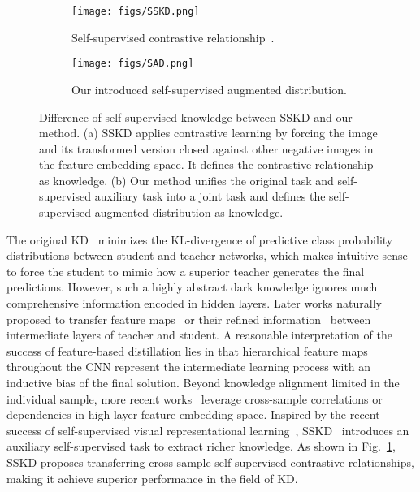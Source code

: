 \documentclass{article}
\begin{document}
\begin{figure}[t]
	\centering 
	\begin{subfigure}[t]{0.43\textwidth}
		\centering
		\texttt{[image: figs/SSKD.png]}
		\caption{Self-supervised contrastive relationship~\cite{DBLP:conf/eccv/XuLLL20}.}
		\label{scl_}
	\end{subfigure}
	\begin{subfigure}[t]{0.45\textwidth}
		\centering
		\texttt{[image: figs/SAD.png]}
		\caption{Our introduced self-supervised augmented distribution.}
		\label{icl_}
	\end{subfigure}
	\caption{Difference of self-supervised knowledge between SSKD and our method. (a) SSKD applies contrastive learning by forcing the image and its transformed version closed against other negative images in the feature embedding space. It defines the contrastive relationship as knowledge. (b) Our method unifies the original task and self-supervised auxiliary task into a joint task and defines the self-supervised augmented distribution as knowledge.}
\end{figure} 

The original KD~\cite{hinton2015distilling} minimizes the KL-divergence of predictive class probability distributions between student and teacher networks, which makes intuitive sense to force the student to mimic how a superior teacher generates the final predictions. However, such a highly abstract dark knowledge ignores much comprehensive information encoded in hidden layers. Later works naturally proposed to transfer feature maps~\cite{romero2014fitnets} or their refined information~\cite{zagoruyko2016paying,heo2019knowledge,Sungsoo19Variational} between intermediate layers of teacher and student. A reasonable interpretation of the success of feature-based distillation lies in that hierarchical feature maps throughout the CNN represent the intermediate learning process with an inductive bias of the final solution. Beyond knowledge alignment limited in the individual sample, more recent works~\cite{peng2019correlation,tian2019contrastive} leverage cross-sample correlations or dependencies in high-layer feature embedding space. Inspired by the recent success of self-supervised visual representational learning~\cite{chen2020simple}, SSKD~\cite{DBLP:conf/eccv/XuLLL20} introduces an auxiliary self-supervised task to extract richer knowledge. As shown in Fig.~\ref{scl_}, SSKD proposes transferring cross-sample self-supervised contrastive relationships, making it achieve superior performance in the field of KD.
\end{document}
